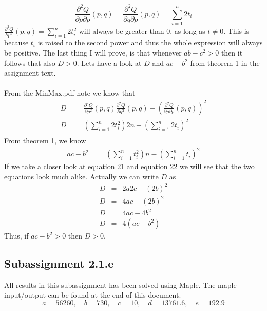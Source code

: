 \documentclass[english]{article}
\begin{document}
\begin{equation}
	\frac{\partial^2 Q}{\partial p \partial p}(p,q)= \frac{\partial^2 Q}{\partial q \partial p}(p,q)= \sum \limits_{i=1}^n 2t_i
\end{equation}
$\frac{\partial^2 Q}{\partial p^2}(p,q)  = \sum \limits_{i=1}^n 2t_i^2$ will always be greater than 0, as long as $t \neq 0$. This is because $t_i$ is raised to the second power and thus the whole expression will always be positive.
The last thing I will prove, is that whenever $ab-c^2 > 0$ then it follows that also $D>0$. Lets have a look at $D$ and $ac-b^2$ from theorem 1 in the assignment text.\\\\
From the MinMax.pdf note we know that
\begin{eqnarray}
D &=& \frac{\partial^2 Q}{\partial p^2}(p,q) \frac{\partial^2 Q}{\partial q^2}(p,q) - (\frac{\partial^2 Q}{\partial p \partial p}(p,q))^2 \\
D &=& (\sum \limits_{i=1}^n 2t_i^2) 2n-(\sum \limits_{i=1}^n 2t_i)^2\\
\end{eqnarray}
From theorem 1, we know
\begin{eqnarray}
	ac-b^2 &=&  (\sum \limits_{i=1}^n t_i^2) n-(\sum \limits_{i=1}^n t_i)^2
\end{eqnarray}
If we take a closer look at equation 21 and equation 22 we will see that the two equations look much alike. Actually we can write $D$ as
\begin{eqnarray}
D &=& 2a2c-(2b)^2 \\
D &=& 4ac-(2b)^2  \\
D &=& 4ac-4b^2 \\
D &=& 4(ac-b^2)
\end{eqnarray}
Thus, if $ac-b^2 > 0 $ then $D > 0$.
\subsection*{Subassignment 2.1.e}
All results in this subassignment has been solved using Maple. The maple input/output can be found at the end of this document.
\begin{equation}
a=56260, \quad b=730, \quad c=10, \quad d=13761.6, \quad e=192.9 
\end{equation}
\end{document}
